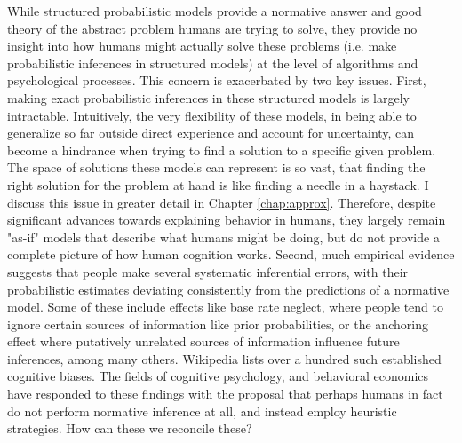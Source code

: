 While structured probabilistic models provide a normative answer and good theory of the abstract problem humans are trying to solve, they provide no insight into how humans might actually solve these problems (i.e. make probabilistic inferences in structured models) at the level of algorithms and psychological processes. %
This concern is exacerbated by two key issues. First, making exact probabilistic inferences in these structured models is largely intractable. Intuitively, the very flexibility of these models, in being able to generalize so far outside direct experience and account for uncertainty, can become a hindrance when trying to find a solution to a specific given problem. The space of solutions these models can represent is so vast, that finding the right solution for the problem at hand is like finding a needle in a haystack. I discuss this issue in greater detail in Chapter \ref{chap:approx}. Therefore, despite significant advances towards explaining behavior in humans, they largely remain "as-if" models that describe what humans might be doing, but do not provide a complete picture of how human cognition works.  Second, much empirical evidence suggests that people make several systematic inferential errors, with their probabilistic estimates deviating consistently from the predictions of a normative model. Some of these include effects like base rate neglect, where people tend to ignore certain sources of information like prior probabilities, or the anchoring effect where putatively unrelated sources of information influence future inferences, among many others. Wikipedia lists over a hundred such established cognitive biases. The fields of cognitive psychology\citep{phillips1966conservatism, gigerenzer1996reasoning}, and behavioral economics\citep{kahneman1973psychology} have responded to these findings with the proposal that perhaps humans in fact do not perform normative inference at all, and instead employ heuristic strategies. How can these we reconcile these?




